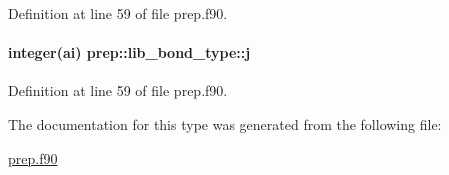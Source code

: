 Definition at line 59 of file prep.\-f90.

\hypertarget{structprep_1_1lib__bond__type_abcfefae0750b1d9c3632e460e99c8bcb}{
\paragraph[{j}]{\setlength{\rightskip}{0pt plus 5cm}integer(ai) prep\-::lib\-\_\-bond\-\_\-type\-::j}}\label{structprep_1_1lib__bond__type_abcfefae0750b1d9c3632e460e99c8bcb}


Definition at line 59 of file prep.\-f90.



The documentation for this type was generated from the following file\-:\begin{DoxyCompactItemize}
\item 
\hyperlink{prep_8f90}{prep.\-f90}\end{DoxyCompactItemize}
